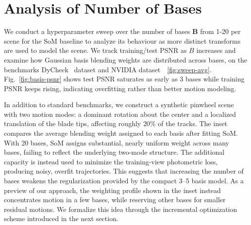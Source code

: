 \section{Analysis of Number of Bases}

We conduct a hyperparameter sweep over the number of bases $\mathbf{B}$ from 1-20 per scene for the SoM baseline to analyze its behaviour as more distinct transforms are used to model the scene.
We track training/test PSNR as $B$ increases and examine how Gaussian basis blending weights are distributed across bases, on the benchmarks DyCheck~\cite{gao2022dynamic} dataset and NVIDIA dataset~\cite{yoon2020novel}~\ref{fig:sweep-avg}. 
Fig.~\ref{fig:basis-psnr} shows test PSNR saturates as early as 3 bases while training PSNR keeps rising, indicating overfitting rather than better motion modeling.



% 

In addition to standard benchmarks, we construct a synthetic pinwheel scene with two motion modes: a dominant rotation about the center and a localized translation of the blade tips, affecting roughly $20\%$ of the tracks. The inset compares the average blending weight assigned to each basis after fitting SoM. With 20 bases, SoM assigns substantial, nearly uniform weight across many bases, failing to reflect the underlying two-mode structure. The additional capacity is instead used to minimize the training-view photometric loss, producing noisy, overfit trajectories. This suggests that increasing the number of bases weakens the regularization provided by the compact 3--5 basis model. As a preview of our approach, the weighting profile shown in the inset instead concentrates motion in a few bases, while reserving other bases for smaller residual motions. We formalize this idea through the incremental optimization scheme introduced in the next section.

